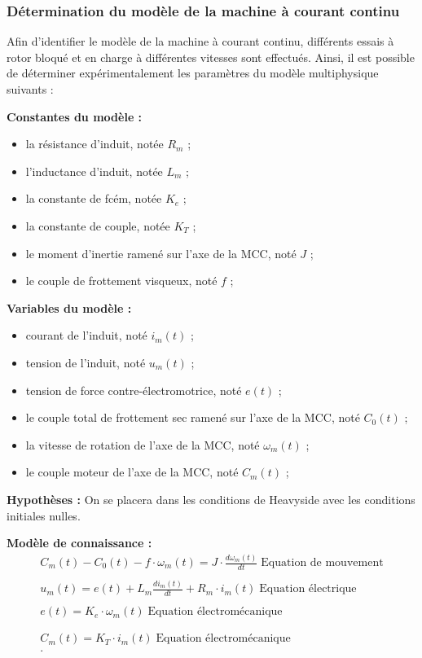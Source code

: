 \subsubsection{Détermination du modèle de la machine à courant continu}

Afin d'identifier le modèle de la machine à courant continu, différents
essais à rotor bloqué et en charge à différentes vitesses sont
effectués. Ainsi, il est possible de déterminer expérimentalement les
paramètres du modèle multiphysique suivants :

\begin{minipage}{0.5\textwidth}
\textbf{Constantes du modèle :}
\begin{itemize}
\item la résistance d'induit, notée $R_m$ ;
\item l'inductance d'induit, notée $L_m$ ;
\item la constante de fcém, notée $K_e$ ;
\item la constante de couple, notée $K_T$ ;
\item le moment d'inertie ramené sur l'axe de la MCC, noté $J$ ;
\item le couple de frottement visqueux, noté $f$ ;
\end{itemize}

\end{minipage}
\begin{minipage}{0.5\textwidth}
\textbf{Variables du modèle : }
\begin{itemize}
\item courant de l'induit, noté $i_m(t)$ ;
\item tension de l'induit, noté $u_m(t)$ ;
\item tension de force contre-électromotrice, noté $e(t)$ ;
\item le couple total de frottement sec ramené sur l'axe de la MCC, noté $C_0(t)$ ;
\item la vitesse de rotation de l'axe de la MCC, noté $\omega_m(t)$ ;
\item le couple moteur de l'axe de la MCC, noté $C_m(t)$ ;
\end{itemize}
\textbf{Hypothèses : } On se placera dans les conditions de Heavyside avec les conditions initiales nulles.

\end{minipage}

\textbf{Modèle de connaissance :}
\begin{align*}
C_m(t)-C_0(t)-f\cdot \omega_m(t)=J\cdot\frac{d\omega_m(t)}{dt}\;\text{Equation de mouvement}\\
\\
u_m(t)=e(t)+L_m\frac{di_m(t)}{dt}+R_m\cdot i_m(t)\;\text{Equation électrique}\\
\\
e(t)=K_e\cdot \omega_m(t)\;\text{Equation électromécanique}\\\\
\\
C_m(t)=K_T\cdot i_m(t)\;\text{Equation électromécanique}\\.
\end{align*}

